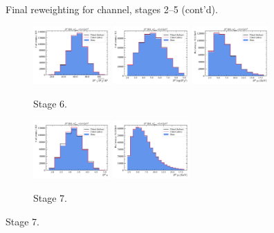 \begin{figure}[htb]
    \caption{Final reweighting for \Dz channel, stages 2--5 (cont'd).}
    \label{fig:final-rwt-d0-idx1}
\end{figure}

\begin{figure}[htb]
    \begin{subfigure}{\textwidth}
        \centering
        \includegraphics[width=0.32\textwidth]{./figs-mc-correction/reweighting-final/plot_step5-D0_iso-d0_comp.pdf}
        \includegraphics[width=0.32\textwidth]{./figs-mc-correction/reweighting-final/plot_step5-D0_iso-d0_log_ip_chi2.pdf}
        \includegraphics[width=0.32\textwidth]{./figs-mc-correction/reweighting-final/plot_step5-D0_iso-d0_pt.pdf}
        \caption{Stage 6.}
    \end{subfigure}

    \begin{subfigure}{\textwidth}
        \centering
        \includegraphics[width=0.32\textwidth]{./figs-mc-correction/reweighting-final/plot_step6-D0_iso-d0_eta.pdf}
        \includegraphics[width=0.32\textwidth]{./figs-mc-correction/reweighting-final/plot_step6-D0_iso-d0_pt.pdf}
        \caption{Stage 7.}
    \end{subfigure}


\end{figure}

